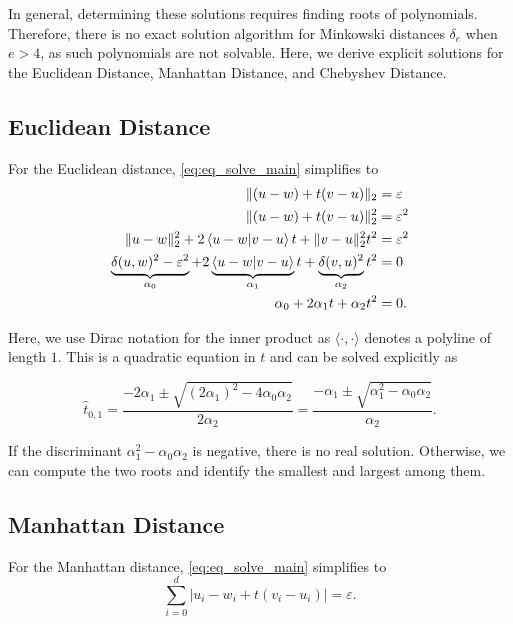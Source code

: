 In general, determining these solutions requires finding roots of polynomials. Therefore, there is no exact solution algorithm for Minkowski distances \(\delta_e\) when \(e > 4\), as such polynomials are not solvable. Here, we derive explicit solutions for the Euclidean Distance, Manhattan Distance, and Chebyshev Distance. 

\subsection{Euclidean Distance}
\label{ssec:eq_euclidean_distance}
For the Euclidean distance, \cref{eq:eq_solve_main} simplifies to 
\begin{align*}
  \| (u - w) + t(v - u) \|_2 &= \varepsilon \\
  \| (u - w) + t(v - u) \|_2^2 &= \varepsilon^2 \\
  \| u - w \|_2^2 + 2\braket{u - w | v - u} t  +  \| v - u \|_2^2 t^2 &= \varepsilon^2 \\
  \underbrace{\delta(u,w)^2 - \varepsilon^2}_{\alpha_0} + 2\underbrace{\braket{u - w | v - u} }_{\alpha_1}t  +  \underbrace{\delta(v, u)^2}_{\alpha_2} t^2 &= 0 \\
  \alpha_0 + 2\alpha_1 t  + \alpha_2 t^2 &= 0.
\end{align*}

Here, we use Dirac notation for the inner product as \(\langle \cdot , \cdot \rangle\) denotes a polyline of length \(1\).
This is a quadratic equation in \(t\) and can be solved explicitly as 

\begin{equation}
	\hat t_{0,1} = \frac{-2\alpha_1 \pm \sqrt{(2\alpha_1)^2 - 4\alpha_0\alpha_2}}{2\alpha_2} = \frac{-\alpha_1 \pm \sqrt{\alpha_1^2 - \alpha_0\alpha_2}}{\alpha_2}.\label{eq:sol_explicit_euclidean}
\end{equation}

If the discriminant \(\alpha_1^2 - \alpha_0\alpha_2\) is negative, there is no real solution. Otherwise, we can compute the two roots and identify the smallest and largest among them. 


\subsection{Manhattan Distance}
\label{ssec:eq_manhattan_distance}
For the Manhattan distance, \cref{eq:eq_solve_main} simplifies to 
\begin{equation}
  \sum_{i=0}^d |u_i - w_i + t (v_i - u_i)| = \varepsilon. \label{eq:solve_manhattan}
\end{equation}

